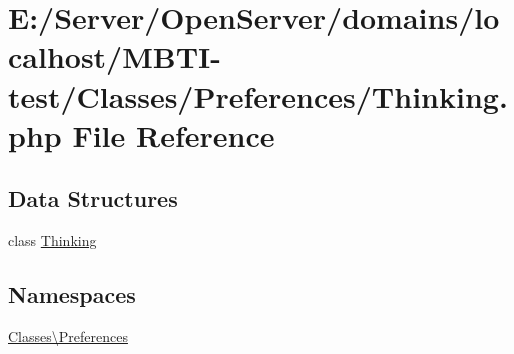 \hypertarget{_thinking_8php}{}\section{E\+:/\+Server/\+Open\+Server/domains/localhost/\+M\+B\+T\+I-\/test/\+Classes/\+Preferences/\+Thinking.php File Reference}
\label{_thinking_8php}
\subsection*{Data Structures}
\begin{DoxyCompactItemize}
\item 
class \hyperlink{class_classes_1_1_preferences_1_1_thinking}{Thinking}
\end{DoxyCompactItemize}
\subsection*{Namespaces}
\begin{DoxyCompactItemize}
\item 
 \hyperlink{namespace_classes_1_1_preferences}{Classes\textbackslash{}\+Preferences}
\end{DoxyCompactItemize}
